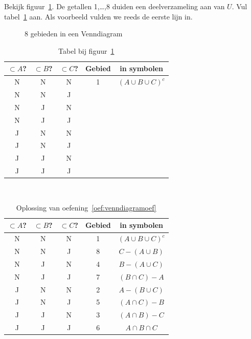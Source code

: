 \newpage
\begin{oef}
\label{oef:venndiagramoef}
Bekijk figuur~\ref{fig:venndiagramoef}. De getallen 1,\dots,8 duiden een deelverzameling aan van $U$. Vul  tabel~\ref{tab:venndiagram} aan. Als voorbeeld vulden we reeds de eerste lijn in.
\begin{figure}[htbp]
\centering

\caption{8 gebieden in een Venndiagram}
\label{fig:venndiagramoef}
\end{figure}
\begin{table}[h!tbp]
\centering
\caption{Tabel bij figuur~\ref{fig:venndiagramoef}}
\begin{tabular}{ccccc}
\toprule
$\subset A$? & $\subset B$? & $\subset C$? & Gebied & in symbolen \\ 
\midrule
N & N & N & 1  & $(A\cup B \cup C)^c$ \\ 
N & N & J &  &   \\ 
N & J & N &   &   \\ 
N & J & J &   &   \\ 
J & N & N &   &   \\ 
J & N & J &   &   \\ 
J & J & N &   &   \\ 
J & J & J &   &   \\ 
\bottomrule
\end{tabular} 
\label{tab:venndiagram}
\end{table}

\begin{opl}
$\qquad$ \\
\begin{table}[h!tbp]
\centering
\caption{Oplossing van oefening~\ref{oef:venndiagramoef}}
\begin{tabular}{ccccc}
\toprule
$\subset A$? & $\subset B$? & $\subset C$? & Gebied & in symbolen \\ 
\midrule
N & N & N & 1  & $(A\cup B \cup C)^c$ \\ 
N & N & J & 8 & $C-(A\cup B)$  \\ 
N & J & N &  4 & $B-(A\cup C)$  \\ 
N & J & J &7   &$(B\cap C)-A$   \\ 
J & N & N &  2 & $A-(B\cup C)$  \\ 
J & N & J & 5  & $(A\cap C)-B$  \\ 
J & J & N & 3  & $(A\cap B)-C$  \\ 
J & J & J & 6  & $A\cap B\cap C$  \\ 
\bottomrule
\end{tabular} 
\label{tab:venndiagram2}
\end{table}

\end{opl}
\end{oef}




